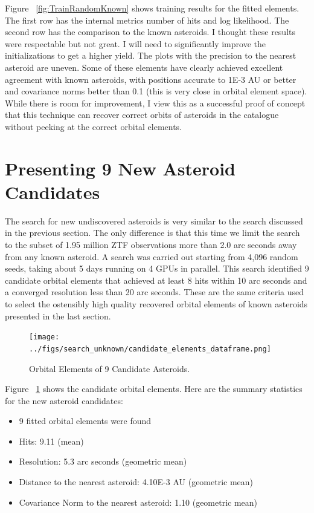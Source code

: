 Figure ~\ref{fig:TrainRandomKnown} shows training results for the fitted elements.
The first row has the internal metrics number of hits and log likelihood.
The second row has the comparison to the known asteroids.
I thought these results were respectable but not great.
I will need to significantly improve the initializations to get a higher yield.
The plots with the precision to the nearest asteroid are uneven.  
Some of these elements have clearly achieved excellent agreement with known asteroids, 
with positions accurate to 1E-3 AU or better and covariance norms better than 0.1 (this is very close in orbital element space).
While there is room for improvement, I view this as a successful proof of concept that this technique can recover correct orbits of asteroids 
in the catalogue without peeking at the correct orbital elements.

\section{Presenting 9 New Asteroid Candidates}
\label{section_results_unknown_ast}
The search for new undiscovered asteroids is very similar to the search discussed in the previous section.
The only difference is that this time we limit the search to the subset of 
1.95 million ZTF observations more than 2.0 arc seconds away from any known asteroid.
A search was carried out starting from 4,096 random seeds, taking about 5 days running on 4 GPUs in parallel.
This search identified 9 candidate orbital elements that achieved at least 8 hits within 10 arc seconds
and a converged resolution less than 20 arc seconds.
These are the same criteria used to select the ostensibly high quality recovered orbital elements of known asteroids presented in the last section.

\begin{figure}[h]
\begin{center}
\texttt{[image: ../figs/search\_unknown/candidate\_elements\_dataframe.png]}
\end{center}
\caption{Orbital Elements of 9 Candidate Asteroids.}
\label{fig:CandidateOrbitalElements}
\end{figure}
Figure ~\ref{fig:CandidateOrbitalElements} shows the candidate orbital elements.
Here are the summary statistics for the new asteroid candidates:
\begin{itemize}
\item 9 fitted orbital elements were found
\item Hits: 9.11 (mean)
\item Resolution: 5.3 arc seconds (geometric mean)
\item Distance to the nearest asteroid: 4.10E-3 AU (geometric mean)
\item Covariance Norm to the nearest asteroid: 1.10 (geometric mean)
\end{itemize}

